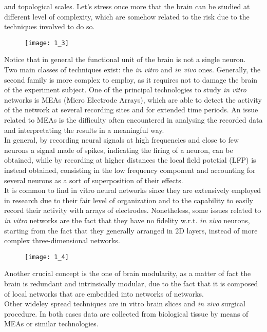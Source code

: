 and topological scales.
Let's stress once more that the brain can be studied at different level of complexity,
which are somehow related to the risk due to the techniques involved to do so.
\begin{figure}[H]
    \texttt{[image: 1\_3]}
    \centering
\end{figure}
Notice that in general the functional unit of the brain is not a single neuron.\\
Two main classes of techniques exist: the \textit{in vitro} and \textit{in vivo} ones. Generally, the
second family is more complex to employ, as it requires not to damage the brain of
the experiment subject. One of the principal technologies to study \textit{in vitro} networks
is MEAs (Micro Electrode Arrays), which are able to detect the activity
of the network at several recording sites and for extended time periods. An issue
related to MEAs is the difficulty often encountered in analysing the recorded data
and interpretating the results in a meaningful way.\\
In general, by recording neural signals at high frequencies and close to few
neurons a signal made of spikes, indicating the firing of a neuron, can be obtained,
while by recording at higher distances the local field potetial (LFP) is instead
obtained, consisting in the low frequency component and accounting for several
neurons as a sort of superposition of their effects.\\
It is common to find in vitro neural networks since they are extensively employed in
research due to their fair level of organization and to the capability to easily
record their activity with arrays of electrodes. Nonetheless, some issues related to
\textit{in vitro} networks are the fact that they have no fidelity w.r.t. \textit{in vivo} neurons,
starting from the fact that they generally arranged in 2D layers, instead of
more complex three-dimensional networks.
\begin{figure}[H]
    \texttt{[image: 1\_4]}
    \centering
\end{figure}
Another crucial concept is the one of brain modularity, as a matter of fact the brain
is redundant and intrinsically modular, due to the fact that it is composed of
local networks that are embedded into networks of networks.\\
Other wideley spread techniques are in vitro brain slices and \textit{in vivo} surgical
procedure. In both cases data are collected from biological tissue by means of
MEAs or similar technologies.\\
